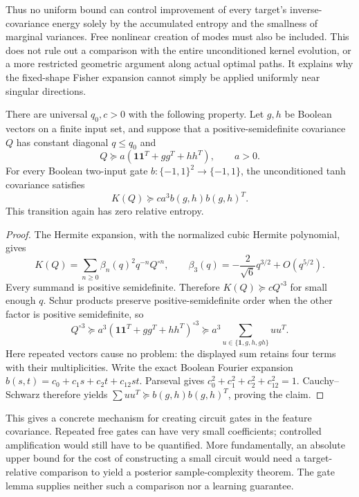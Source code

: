 Thus no uniform bound can control improvement of every target's
inverse-covariance energy solely by the accumulated entropy and the
smallness of marginal variances. Free nonlinear creation of modes
must also be included. This does not rule out a comparison with the
entire unconditioned kernel evolution, or a more restricted geometric
argument along actual optimal paths. It explains why the fixed-shape
Fisher expansion cannot simply be applied uniformly near singular
directions.

\begin{proposition}
\label{prop:critical-free-boolean-gate}
There are universal $q_0,c>0$ with the following property. Let
$g,h$ be Boolean vectors on a finite input set, and suppose that a
positive-semidefinite covariance $Q$ has constant diagonal
$q\le q_0$ and
\[
 Q\succeq a(\mathbf1\mathbf1^T+gg^T+hh^T),\qquad a>0.
\]
For every Boolean two-input gate $b:\{-1,1\}^2\to\{-1,1\}$,
the unconditioned tanh covariance satisfies
\[
 K(Q)\succeq c a^3 b(g,h)b(g,h)^T.
\]
This transition again has zero relative entropy.
\end{proposition}

\begin{proof}
The Hermite expansion, with the normalized cubic Hermite polynomial,
gives
\[
 K(Q)=\sum_{n\ge0}\beta_n(q)^2 q^{-n}Q^{\circ n},\qquad
 \beta_3(q)=-\frac{2}{\sqrt6}q^{3/2}+O(q^{5/2}).
\]
Every summand is positive semidefinite. Therefore
$K(Q)\succeq cQ^{\circ3}$ for small enough $q$. Schur products
preserve positive-semidefinite order when the other factor is
positive semidefinite, so
\[
 Q^{\circ3}\succeq
 a^3(\mathbf1\mathbf1^T+gg^T+hh^T)^{\circ3}
 \succeq a^3\sum_{u\in\{\mathbf1,g,h,gh\}}uu^T.
\]
Here repeated vectors cause no problem: the displayed sum retains
four terms with their multiplicities. Write the exact Boolean Fourier
expansion
$b(s,t)=c_0+c_1s+c_2t+c_{12}st$. Parseval gives
$c_0^2+c_1^2+c_2^2+c_{12}^2=1$. Cauchy--Schwarz therefore yields
$\sum uu^T\succeq b(g,h)b(g,h)^T$, proving the claim.
\end{proof}

This gives a concrete mechanism for creating circuit gates in the
feature covariance. Repeated free gates can have very small
coefficients; controlled amplification would still have to be
quantified. More fundamentally, an absolute upper bound for the cost
of constructing a small circuit would need a target-relative
comparison to yield a posterior sample-complexity theorem. The gate
lemma supplies neither such a comparison nor a learning guarantee.

